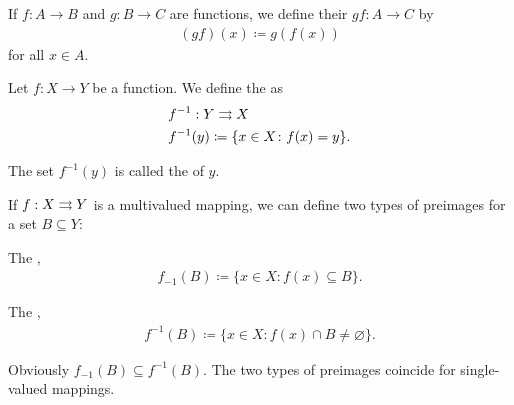 \begin{definition}\label{def:function_composition}
  If $f: A \to B$ and $g: B \to C$ are functions, we define their  $gf: A \to C$ by
  \begin{align*}
    (gf)(x) \coloneqq g(f(x))
  \end{align*}
  for all $x \in A$.
\end{definition}

\begin{definition}\label{def:function_preimage}
  Let $f: X \to Y$ be a function. We define the  as
  \begin{align*}
    &f^{-1} : Y \rightrightarrows X \\
    &f^{-1}(y) \coloneqq \{ x \in X \colon f(x) = y \}.
  \end{align*}

  The set $f^{-1}(y)$ is called the  of $y$.

  If $f : X \rightrightarrows Y$ is a multivalued mapping, we can define two types of preimages for a set $B \subseteq Y$:
  \begin{defenum}
    \item The ,
    \begin{align*}
      f_{-1}(B) \coloneqq \{ x \in X \colon f(x) \subseteq B \}.
    \end{align*}

    \item The ,
    \begin{align*}
      f^{-1}(B) \coloneqq \{ x \in X \colon f(x) \cap B \neq \varnothing \}.
    \end{align*}
  \end{defenum}

  Obviously $f_{-1}(B) \subseteq f^{-1}(B)$. The two types of preimages coincide for single-valued mappings.
\end{definition}

